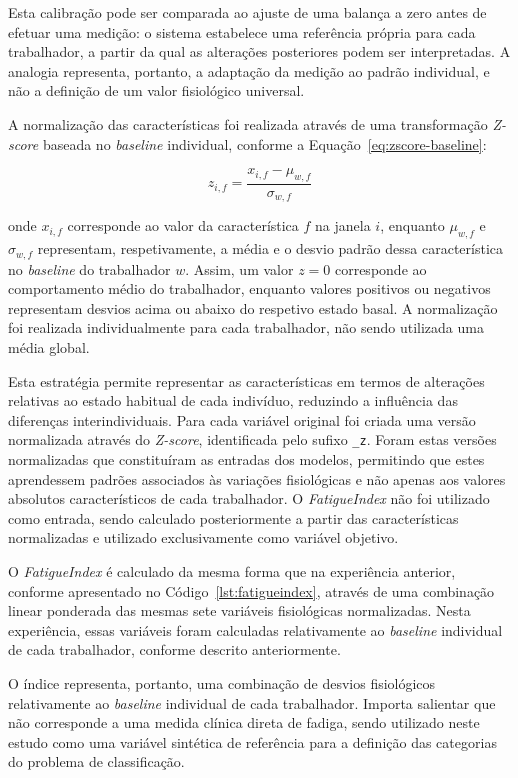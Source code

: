 Esta calibração pode ser comparada ao ajuste de uma balança a zero antes de efetuar uma medição: o sistema estabelece uma referência própria para cada trabalhador, a partir da qual as alterações posteriores podem ser interpretadas. A analogia representa, portanto, a adaptação da medição ao padrão individual, e não a definição de um valor fisiológico universal.

A normalização das características foi realizada através de uma transformação \textit{Z-score} baseada no \textit{baseline} individual, conforme a Equação~\ref{eq:zscore-baseline}:

\begin{equation}
z_{i,f} = \frac{x_{i,f}-\mu_{w,f}}{\sigma_{w,f}}
\label{eq:zscore-baseline}
\end{equation}

onde $x_{i,f}$ corresponde ao valor da característica $f$ na janela $i$, enquanto $\mu_{w,f}$ e $\sigma_{w,f}$ representam, respetivamente, a média e o desvio padrão dessa característica no \textit{baseline} do trabalhador $w$. Assim, um valor $z=0$ corresponde ao comportamento médio do trabalhador, enquanto valores positivos ou negativos representam desvios acima ou abaixo do respetivo estado basal. A normalização foi realizada individualmente para cada trabalhador, não sendo utilizada uma média global.

Esta estratégia permite representar as características em termos de alterações relativas ao estado habitual de cada indivíduo, reduzindo a influência das diferenças interindividuais. Para cada variável original foi criada uma versão normalizada através do \textit{Z-score}, identificada pelo sufixo \texttt{\_z}. Foram estas versões normalizadas que constituíram as entradas dos modelos, permitindo que estes aprendessem padrões associados às variações fisiológicas e não apenas aos valores absolutos característicos de cada trabalhador. O \textit{FatigueIndex} não foi utilizado como entrada, sendo calculado posteriormente a partir das características normalizadas e utilizado exclusivamente como variável objetivo.

O \textit{FatigueIndex} é calculado da mesma forma que na experiência anterior, conforme apresentado no Código~\ref{lst:fatigueindex}, através de uma combinação linear ponderada das mesmas sete variáveis fisiológicas normalizadas. Nesta experiência, essas variáveis foram calculadas relativamente ao \textit{baseline} individual de cada trabalhador, conforme descrito anteriormente.

O índice representa, portanto, uma combinação de desvios fisiológicos relativamente ao \textit{baseline} individual de cada trabalhador. Importa salientar que não corresponde a uma medida clínica direta de fadiga, sendo utilizado neste estudo como uma variável sintética de referência para a definição das categorias do problema de classificação.

